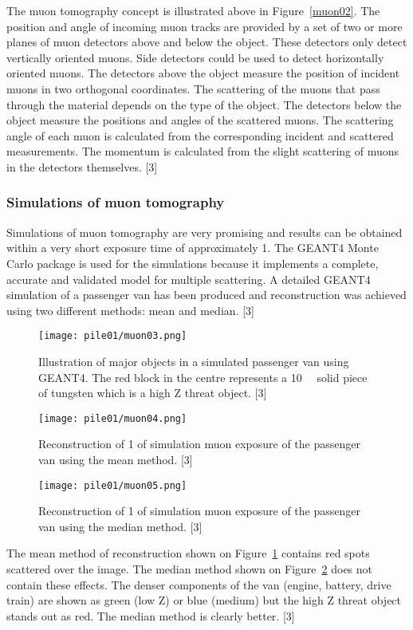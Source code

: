 \documentclass[a4paper]{article}
\begin{document}
The muon tomography concept is illustrated above in Figure~\ref{muon02}. The position and angle of incoming
muon tracks are provided by a set of two or more planes of muon detectors above and below the
object. These detectors only detect vertically oriented muons. Side detectors could be used to
detect horizontally oriented muons. The detectors above the object measure the position of incident
muons in two orthogonal coordinates. The scattering of the muons that pass through the material
depends on the type of the object. The detectors below the object measure the positions and angles
of the scattered muons. The scattering angle of each muon is calculated from the corresponding
incident and scattered measurements. The momentum is calculated from the slight scattering of
muons in the detectors themselves. [3]

\subsubsection{Simulations of muon tomography}
Simulations of muon tomography are very promising and results can be obtained within a very short
exposure time of approximately \unit{1}{\minute}. The GEANT4 Monte Carlo package is used for the simulations
because it implements a complete, accurate and validated model for multiple scattering. A detailed
GEANT4 simulation of a passenger van has been produced and reconstruction was achieved using
two different methods: mean and median. [3]

\begin{figure}[h!]
  \texttt{[image: pile01/muon03.png]}
  \caption{Illustration of major objects in a simulated passenger van using GEANT4. The red block in
the centre represents a \unit{10}{\cubic{\centi\metre}} solid piece of tungsten which is a high Z threat object. [3]}
\end{figure}
\begin{figure}[h!]
  \texttt{[image: pile01/muon04.png]}
  \caption{Reconstruction of \unit{1}{\minute} of simulation muon exposure of the passenger van using the
mean method. [3]}
  \label{muon04}
\end{figure}
\begin{figure}[h!]
  \texttt{[image: pile01/muon05.png]}
  \caption{Reconstruction of \unit{1}{\minute} of simulation muon exposure of the passenger van using the
median method. [3]}
  \label{muon05}
\end{figure}

The mean method of reconstruction shown on Figure~\ref{muon04} contains red spots scattered over the image.
The median method shown on Figure~\ref{muon05} does not contain these effects. The denser components of
the van (engine, battery, drive train) are shown as green (low Z) or blue (medium) but the high Z
threat object stands out as red. The median method is clearly better. [3]
\end{document}
